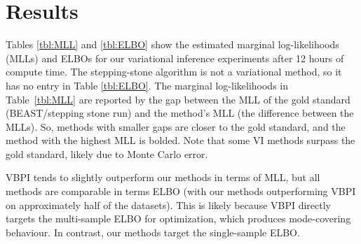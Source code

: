 \section{Results}

Tables \ref{tbl:MLL} and \ref{tbl:ELBO} show the estimated marginal log-likelihoods (MLLs) and ELBOs for our variational inference experiments after 12 hours of compute time. The stepping-stone algorithm is not a variational method, so it has no entry in Table \ref{tbl:ELBO}.
%
The marginal log-likelihoods in Table~\ref{tbl:MLL} are reported by the gap between the MLL of the gold standard (BEAST/stepping stone run) and the method's MLL (the difference between the MLLs). So, methods with smaller gaps are closer to the gold standard, and the method with the highest MLL is bolded. Note that some VI methods surpass the gold standard, likely due to Monte Carlo error. 

VBPI tends to slightly outperform our \model methods in terms of MLL, but all methods are comparable in terms ELBO (with our methods outperforming VBPI on approximately half of the datasets). This is likely because VBPI directly targets the multi-sample ELBO for optimization, which produces mode-covering behaviour. In contrast, our \model methods target the single-sample ELBO.

